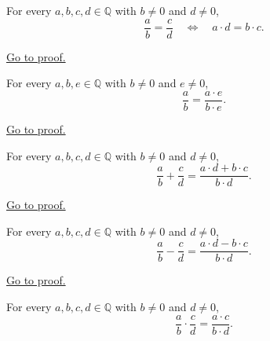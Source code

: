 \begin{theorem}
\label{thm:rational-cross-multiplication}
For every $a,b,c,d\in\mathbb{Q}$ with $b\neq 0$ and $d\neq 0$,
\[
\frac{a}{b}=\frac{c}{d}
\quad\Longleftrightarrow\quad
a\cdot d=b\cdot c.
\]
\end{theorem}

\begin{remark*}[Proof]
\hyperref[prf:rational-cross-multiplication]{Go to proof.}
\end{remark*}

\begin{theorem}
\label{thm:rational-fraction-scaling}
For every $a,b,e\in\mathbb{Q}$ with $b\neq 0$ and $e\neq 0$,
\[
\frac{a}{b}=\frac{a\cdot e}{b\cdot e}.
\]
\end{theorem}

\begin{remark*}[Proof]
\hyperref[prf:rational-fraction-scaling]{Go to proof.}
\end{remark*}

\begin{theorem}
\label{thm:rational-fraction-addition}
For every $a,b,c,d\in\mathbb{Q}$ with $b\neq 0$ and $d\neq 0$,
\[
\frac{a}{b}+\frac{c}{d}
=
\frac{a\cdot d+b\cdot c}{b\cdot d}.
\]
\end{theorem}

\begin{remark*}[Proof]
\hyperref[prf:rational-fraction-addition]{Go to proof.}
\end{remark*}

\begin{theorem}
\label{thm:rational-fraction-subtraction}
For every $a,b,c,d\in\mathbb{Q}$ with $b\neq 0$ and $d\neq 0$,
\[
\frac{a}{b}-\frac{c}{d}
=
\frac{a\cdot d-b\cdot c}{b\cdot d}.
\]
\end{theorem}

\begin{remark*}[Proof]
\hyperref[prf:rational-fraction-subtraction]{Go to proof.}
\end{remark*}

\begin{theorem}
\label{thm:rational-fraction-multiplication}
For every $a,b,c,d\in\mathbb{Q}$ with $b\neq 0$ and $d\neq 0$,
\[
\frac{a}{b}\cdot \frac{c}{d}
=
\frac{a\cdot c}{b\cdot d}.
\]
\end{theorem}

